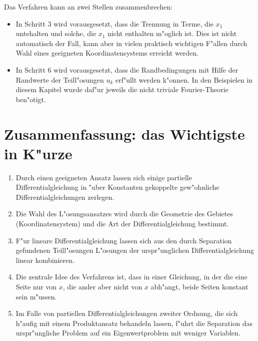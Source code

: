 Das Verfahren kann an zwei Stellen zusammenbrechen:
\begin{itemize}
\item In Schritt 3 wird vorausgesetzt, dass die Trennung in 
Terme, die $x_1$ untehalten  und solche, die $x_1$ nicht enthalten
m"oglich ist. Dies ist nicht automatisch der Fall, kann aber in
vielen praktisch wichtigen F"allen durch Wahl eines geeigneten
Koordinatensystems erreicht werden.
\item In Schritt 6 wird vorausgesetzt, dass die Randbedingungen
mit Hilfe der Randwerte der Teill"osungen $u_k$ erf"ullt werden
k"onnen. In den Beispielen in diesem Kapitel wurde daf"ur jeweils
die nicht triviale Fourier-Theorie ben"otigt. 
\end{itemize}

\section{Zusammenfassung: das Wichtigste in K"urze}
\begin{enumerate}
\item
Durch einen geeigneten Ansatz lassen sich einige partielle
Differentialgleichung in "uber Konstanten gekoppelte gew"ohnliche
Differentialgleichungen zerlegen.
\item
Die Wahl des L"osungsansatzes wird durch die Geometrie des Gebietes
(Koordinatensystem) und die Art der Differentialgleichung bestimmt.
\item
F"ur lineare Differentialgleichung lassen sich aus den durch Separation
gefundenen Teill"osungen L"osungen der urspr"unglichen Differentialgleichung
linear kombinieren.
\item
Die zentrale Idee des Verfahrens ist, dass in einer Gleichung,
in der die eine Seite nur von $x$, die ander aber nicht von $x$
abh"angt, beide Seiten konstant sein m"ussen.
\item
Im Falle von partiellen Differentialgleichungen zweiter Ordnung, die
sich h"aufig mit einem Produktansatz behandeln lassen, f"uhrt die
Separation das urspr"ungliche Problem auf ein Eigenwertproblem mit
weniger Variablen.
\end{enumerate}
